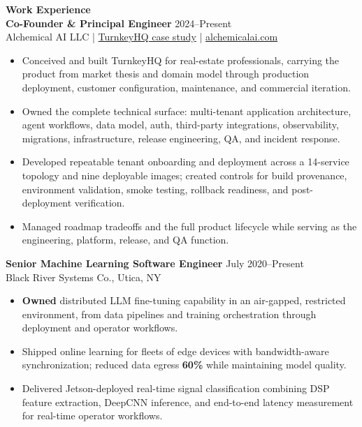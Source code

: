 \documentclass[10.5pt]{res}
\begin{document}
\begin{resume}
{\bf Work Experience} \vspace{0.15 cm} \\
{\bf Co-Founder \& Principal Engineer} \hfill 2024--Present\\
Alchemical AI LLC | \href{https://jasonstgeorge.com/turnkeyhq}{TurnkeyHQ case study} | \href{https://alchemicalai.com}{alchemicalai.com} \\
\begin{itemize}[itemsep=1pt,topsep=2pt]
    \item Conceived and built TurnkeyHQ for real-estate professionals, carrying the product from market thesis and domain model through production deployment, customer configuration, maintenance, and commercial iteration.
    \item Owned the complete technical surface: multi-tenant application architecture, agent workflows, data model, auth, third-party integrations, observability, migrations, infrastructure, release engineering, QA, and incident response.
    \item Developed repeatable tenant onboarding and deployment across a 14-service topology and nine deployable images; created controls for build provenance, environment validation, smoke testing, rollback readiness, and post-deployment verification.
    \item Managed roadmap tradeoffs and the full product lifecycle while serving as the engineering, platform, release, and QA function.
\end{itemize}

{\bf Senior Machine Learning Software Engineer} \hfill July 2020--Present\\
Black River Systems Co., Utica, NY \\
\begin{itemize}[itemsep=1pt,topsep=2pt]
    \item \textbf{Owned} distributed LLM fine-tuning capability in an air-gapped, restricted environment, from data pipelines and training orchestration through deployment and operator workflows.
    \item Shipped online learning for fleets of edge devices with bandwidth-aware synchronization; reduced data egress \textbf{60\%} while maintaining model quality.
    \item Delivered Jetson-deployed real-time signal classification combining DSP feature extraction, DeepCNN inference, and end-to-end latency measurement for real-time operator workflows.
\end{itemize}


\end{resume}
\end{document}

